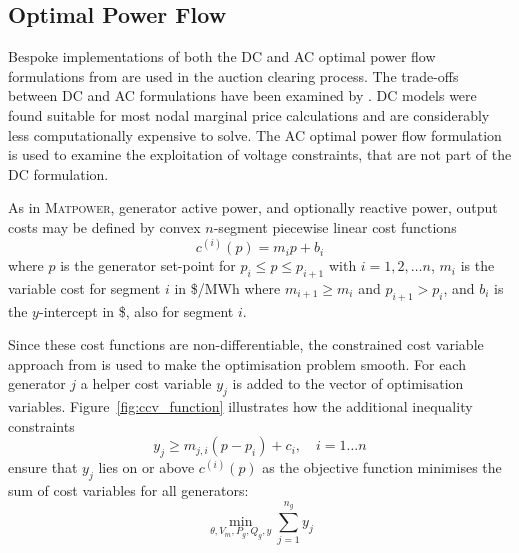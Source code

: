 \subsection{Optimal Power Flow}
\label{sec:pw_linear}
Bespoke implementations of both the DC and AC optimal power flow formulations
from \matpower are used in the auction clearing process. The trade-offs between
DC and AC formulations have been examined by .  DC models
were found suitable for most nodal marginal price calculations and are
considerably less computationally expensive to solve.  The AC optimal power
flow formulation is used to examine the exploitation of voltage
constraints, that are not part of the DC formulation.

%

As in \textsc{Matpower}, generator active power, and optionally reactive power,
output costs may be defined by convex $n$-segment piecewise linear cost
functions
\begin{equation}
c^{(i)}(p) = m_ip + b_i
\end{equation}
where $p$ is the generator set-point for $p_i \leq p \leq p_{i+1}$ with
$i = 1,2,\dotsc n$, $m_i$ is the variable cost for segment $i$ in
\$/MWh where $m_{i+1} \geq m_i$ and $p_{i+1} > p_i$, and $b_i$ is the
$y$-intercept in \$, also for segment $i$.

Since these cost functions are non-differentiable, the constrained cost variable
approach from  is used to make the optimisation problem
smooth.  For each generator $j$ a helper cost variable $y_j$ is added to the
vector of optimisation variables.  Figure~\ref{fig:ccv_function}
\cite[Figure5-3]{pserc:mp_manual} illustrates how the additional inequality
constraints
\begin{equation}
y_j \geq m_{j,i}(p-p_i) + c_i, \quad i = 1\dotsc n
\end{equation}
ensure that $y_j$ lies on or above $c^{(i)}(p)$ as the objective function
minimises the sum of cost variables for all generators:
\begin{equation}
\min_{\theta, V_m, P_g, Q_g, y} \sum_{j=1}^{n_g}y_j
\end{equation}

